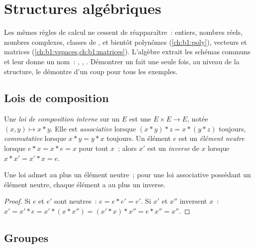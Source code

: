 \chapter{Structures algébriques}\label{ch:b1:structures}

Les mêmes règles de calcul ne cessent de réapparaître~: entiers, nombres
réels, nombres complexes, classes de , et bientôt polynômes
(\cref{ch:b1:poly}), vecteurs et matrices
(\cref{ch:b1:vspaces,ch:b1:matrices}). L'algèbre extrait les schémas
communs et leur donne un nom~: \emph{}, \emph{},
\emph{}. Démontrer un fait une seule fois, au niveau de la
structure, le démontre d'un coup pour tous les exemples.

\section{Lois de composition}

\begin{definition}\label{def:b1:structures:law}
Une \emph{loi de composition interne}
sur un  $E$ est une  $E \times E \to E$, notée
$(x, y) \mapsto x * y$. Elle est \emph{associative} lorsque
$(x*y)*z = x*(y*z)$ toujours, \emph{commutative} lorsque $x * y = y * x$
toujours. Un élément $e$ est un \emph{élément neutre} lorsque
$e * x = x * e = x$ pour tout $x$~; alors $x'$ est un \emph{inverse} de
$x$ lorsque $x * x' = x' * x = e$.
\end{definition}

\begin{proposition}[Unicité]\label{prop:b1:structures:unique}
Une loi admet au plus un élément neutre~; pour une loi associative
possédant un élément neutre, chaque élément a au plus un inverse.
\end{proposition}

\begin{proof}
Si $e$ et $e'$ sont neutres~: $e = e * e' = e'$. Si $x'$ et $x''$
inversent $x$~: $x' = x' * e = x' * (x * x'') = (x' * x) * x'' = e * x''
= x''$.
\end{proof}

\section{Groupes}


